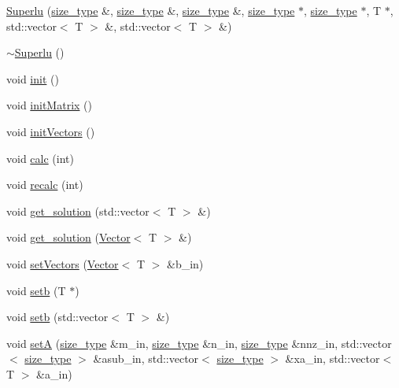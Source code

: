 \begin{DoxyCompactItemize}
\hyperlink{classlmx_1_1Superlu_a1fb4602b567b3279a04d881402a693d8}{Superlu} (\hyperlink{lmx__mat__data_8h_a49b489a408a211a90e766329c0732d7b}{size\-\_\-type} \&, \hyperlink{lmx__mat__data_8h_a49b489a408a211a90e766329c0732d7b}{size\-\_\-type} \&, \hyperlink{lmx__mat__data_8h_a49b489a408a211a90e766329c0732d7b}{size\-\_\-type} \&, \hyperlink{lmx__mat__data_8h_a49b489a408a211a90e766329c0732d7b}{size\-\_\-type} $\ast$, \hyperlink{lmx__mat__data_8h_a49b489a408a211a90e766329c0732d7b}{size\-\_\-type} $\ast$, T $\ast$, std\-::vector$<$ T $>$ \&, std\-::vector$<$ T $>$ \&)
\item 
\hyperlink{classlmx_1_1Superlu_ab0d48784ef7552c05279dd566ed59d04}{$\sim$\-Superlu} ()
\item 
void \hyperlink{classlmx_1_1Superlu_a450f46f145bbe53084ced59430b3ccec}{init} ()
\item 
void \hyperlink{classlmx_1_1Superlu_a2d3183b1a44436648effdee08f7bc136}{init\-Matrix} ()
\item 
void \hyperlink{classlmx_1_1Superlu_aed7d3c98719ca7ed9aa3c7cb47e1fc5a}{init\-Vectors} ()
\item 
void \hyperlink{classlmx_1_1Superlu_a91e191a919f26888fb4fded4de8e477e}{calc} (int)
\item 
void \hyperlink{classlmx_1_1Superlu_adb214bf9ef4ea3bce33011671f078df2}{recalc} (int)
\item 
void \hyperlink{classlmx_1_1Superlu_af4f2b6342ee79a027e45cd9cb67e3c04}{get\-\_\-solution} (std\-::vector$<$ T $>$ \&)
\item 
void \hyperlink{classlmx_1_1Superlu_a275e7d970b887661ff4bd301c42d14ef}{get\-\_\-solution} (\hyperlink{classlmx_1_1Vector}{Vector}$<$ T $>$ \&)
\item 
void \hyperlink{classlmx_1_1Superlu_aa9a5857bcc40fab4933a916df751bedd}{set\-Vectors} (\hyperlink{classlmx_1_1Vector}{Vector}$<$ T $>$ \&b\-\_\-in)
\item 
void \hyperlink{classlmx_1_1Superlu_abcce77603009829748b6c96a537977d0}{setb} (T $\ast$)
\item 
void \hyperlink{classlmx_1_1Superlu_a3dd3cefcc50d4569e6b4cf8502a0c366}{setb} (std\-::vector$<$ T $>$ \&)
\item 
void \hyperlink{classlmx_1_1Superlu_a9e025d75b97197ea9b1700c3bad8fccd}{set\-A} (\hyperlink{lmx__mat__data_8h_a49b489a408a211a90e766329c0732d7b}{size\-\_\-type} \&m\-\_\-in, \hyperlink{lmx__mat__data_8h_a49b489a408a211a90e766329c0732d7b}{size\-\_\-type} \&n\-\_\-in, \hyperlink{lmx__mat__data_8h_a49b489a408a211a90e766329c0732d7b}{size\-\_\-type} \&nnz\-\_\-in, std\-::vector$<$ \hyperlink{lmx__mat__data_8h_a49b489a408a211a90e766329c0732d7b}{size\-\_\-type} $>$ \&asub\-\_\-in, std\-::vector$<$ \hyperlink{lmx__mat__data_8h_a49b489a408a211a90e766329c0732d7b}{size\-\_\-type} $>$ \&xa\-\_\-in, std\-::vector$<$ T $>$ \&a\-\_\-in)

\end{DoxyCompactItemize}

